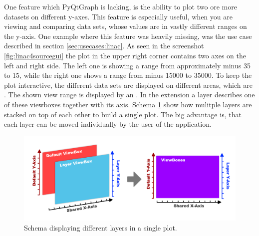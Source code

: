 One feature which PyQtGraph is lacking, is the ability to plot two ore more
datasets on different y-axes. This feature is especially useful, when you are
viewing and comparing data sets, whose values are in vastly different ranges on
the y-axis. One example where this feature was heavily missing, was the use case
described in section \ref{sec:usecases:linac}. As seen in the screenshot
\ref{fig:linac4sourcegui} the plot in the upper right corner contains two axes
on the left and right side. The left one is showing a range from approximately
minus 35 to 15, while the right one shows a range from minus 15000 to 35000. To
keep the plot interactive, the different data sets are displayed on different
areas, which are . The shown view range is
displayed by an . In the extension a
layer describes one of these viewboxes together with its axis. Schema
\ref{fig:application:pyqtgraph:layers} show how mulitple layers are stacked on
top of each other to build a single plot. The big advantage is, that each layer
can be moved individually by the user of the application.

\begin{figure}[h]
    \centering
    \includegraphics[width=14cm]{resources/img/PyQtGraphLayers}
    \caption{Schema displaying different layers in a single plot.}
    \label{fig:application:pyqtgraph:layers}
\end{figure}

